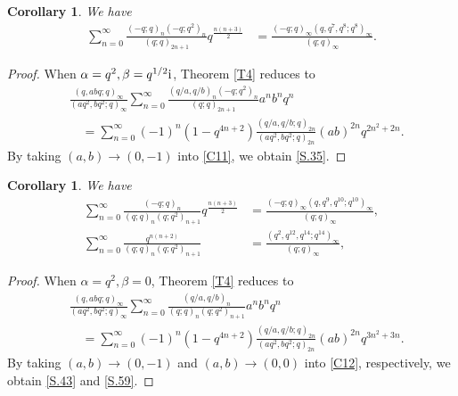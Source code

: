 \documentclass[reqno,12pt]{amsart}
\newtheorem{corollary}[theorem]{Corollary}
\theoremstyle{remark}
\numberwithin{equation}{section}
\begin{document}
\begin{corollary}
We have
\begin{align}
\sum_{n=0}^{\infty}\frac{
\left(-q;q\right)_{n}\left(-q;q^2\right)_{n}
}{\left(q;q\right)_{2n+1}}q^{\frac{n\left(n+3\right)}{2}}
&=\frac{\left(-q;q\right)_{\infty}\left(q,q^7,q^8;q^8\right)_{\infty}}
{\left(q;q\right)_{\infty}}.\tag{S.35\,and\,S.106} \label{S.35}
\end{align}
\end{corollary}
\begin{proof}
When $\alpha=q^2,\beta=q^{1/2}{\rm i}$, Theorem \ref{T4} reduces to 
\begin{align}
&\frac{\left(q,abq;q\right)_{\infty}}{\left(aq^2,bq^2;q\right)_{\infty}}
\sum_{n=0}^{\infty}\frac{\left(q/a,q/b\right)_n\left(-q;q^2\right)_n}{\left(q;q\right)_{2n+1}}a^nb^nq^n
\nonumber\\
&\quad=
\sum_{n=0}^{\infty}\left(-1\right)^n\left(1-q^{4n+2}\right)\frac{\left(q/a,q/b;q\right)_{2n}}
{\left(aq^2,bq^2;q\right)_{2n}}\left(ab\right)^{2n}q^{2n^2+2n}.\label{C11}
\end{align}
By taking $\left(a,b\right)\to\left(0,-1\right)$ into \eqref{C11}, we obtain \eqref{S.35}.
\end{proof}
\begin{corollary}
We have
\begin{align}
\sum_{n=0}^{\infty}\frac{\left(-q;q\right)_n}{\left(q;q\right)_n
\left(q;q^2\right)_{n+1}}q^{\frac{n\left(n+3\right)}{2}}
&=\frac{\left(-q;q\right)_{\infty}\left(q,q^9,q^{10};q^{10}\right)_{\infty}}
{\left(q;q\right)_{\infty}},\tag{S.43}\label{S.43}
\\
\sum_{n=0}^{\infty}\frac{q^{n\left(n+2\right)}}
{\left(q;q\right)_n\left(q;q^2\right)_{n+1}}
&=\frac{\left(q^2,q^{12},q^{14};q^{14}\right)_{\infty}}{\left(q;q\right)_{\infty}}
,\tag{S.59}\label{S.59}
\end{align}
\end{corollary}
%
\begin{proof}
When $\alpha=q^2,\beta=0$, Theorem \ref{T4} reduces to 
\begin{align}
&\frac{\left(q,abq;q\right)_{\infty}}{\left(aq^2,bq^2;q\right)_{\infty}}
\sum_{n=0}^{\infty}\frac{\left(q/a,q/b\right)_n}{\left(q;q\right)_{n}\left(q;q^2\right)_{n+1}}a^nb^nq^n
\nonumber\\
&\quad=
\sum_{n=0}^{\infty}\left(-1\right)^n\left(1-q^{4n+2}\right)\frac{\left(q/a,q/b;q\right)_{2n}}
{\left(aq^2,bq^2;q\right)_{2n}}\left(ab\right)^{2n}q^{3n^2+3n}.\label{C12}
\end{align}
By taking $\left(a,b\right)\to\left(0,-1\right)$ and $\left(a,b\right)\to\left(0,0\right)$ into \eqref{C12}, respectively,  we obtain \eqref{S.43} and  \eqref{S.59}.
\end{proof}
\end{document}
